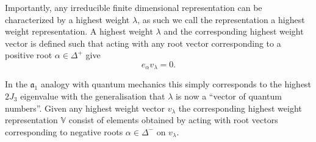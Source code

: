 Importantly, any irreducible finite dimensional representation can be characterized by a highest weight $\lambda$, as such we call the representation a highest weight representation. A highest weight $\lambda$ and the corresponding highest weight vector is defined such that acting with any root vector corresponding to a positive root $\alpha\in\Delta^+$ give
\begin{equation}
    e_\alpha v_\lambda = 0.
\end{equation}

In the $\mathfrak{a}_1$ analogy with quantum mechanics this simply corresponds to the highest $2J_3$ eigenvalue with the generalisation that $\lambda$ is now a ``vector of quantum numbers''. Given any highest weight vector $v_\lambda$ the corresponding highest weight representation $\mathbb{V}$ consist of elements obtained by acting with root vectors corresponding to negative roots $\alpha\in\Delta^-$ on $v_\lambda$.

